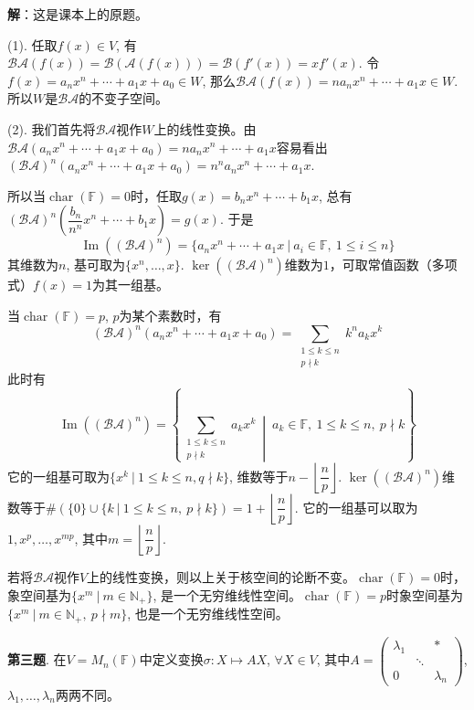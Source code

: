 {\bf 解}：这是课本上的原题。

(1). 任取$f(x) \in V$, 有$\mathscr{BA}(f(x)) = \mathscr{B}(\mathscr{A}(f(x))) = \mathscr{B}(f'(x)) = xf'(x)$. 令$f(x) = a_nx^n + \cdots + a_1x + a_0 \in W$, 那么$\mathscr{BA}(f(x)) = na_nx^n + \cdots + a_1x \in W$. 所以$W$是$\mathscr{BA}$的不变子空间。

(2). 我们首先将$\mathscr{BA}$视作$W$上的线性变换。由$\mathscr{BA}(a_nx^n + \cdots + a_1x + a_0) = na_nx^n + \cdots + a_1x$容易看出$(\mathscr{BA})^n(a_nx^n + \cdots + a_1x + a_0) = n^na_nx^n + \cdots + a_1x$.

所以当$\operatorname{char}(\mathbb{F}) = 0$时，任取$g(x) = b_nx^n + \cdots + b_1x$, 总有$(\mathscr{BA})^n\left(\dfrac{b_n}{n^n} x^n + \cdots + b_1x\right) = g(x).$ 于是
$$\operatorname{Im}((\mathscr{BA})^n) = \{ a_nx^n + \cdots + a_1x \ |\ a_i\in\mathbb{F},~ 1\leqslant i \leqslant n \}$$
其维数为$n$, 基可取为$\{x^n, \ldots, x\}$. $\ker((\mathscr{BA})^n)$维数为$1$，可取常值函数（多项式）$f(x) = 1$为其一组基。

当$\operatorname{char}(\mathbb{F}) = p$, $p$为某个素数时，有
$$(\mathscr{BA})^n(a_nx^n + \cdots + a_1x + a_0) = \sum_{\substack{1\leqslant k \leqslant n \\ p\nmid k}} k^n a_k x^k$$
此时有
$$\operatorname{Im}((\mathscr{BA})^n) = \left\{ \sum_{\substack{1\leqslant k \leqslant n \\ p\nmid k}} a_k x^k \ \middle|\ a_k\in\mathbb{F},~ 1\leqslant k \leqslant n, ~ p\nmid k \right\}$$
它的一组基可取为$\{ x^k \ |\ 1 \leqslant k \leqslant n, q\nmid k \}$, 维数等于$n - \left\lfloor \dfrac{n}{p} \right\rfloor$. $\ker((\mathscr{BA})^n)$维数等于$\# (\{ 0 \} \cup \{ k \ |\ 1\leqslant k \leqslant n, ~ p\nmid k \}) = 1 + \left\lfloor \dfrac{n}{p} \right\rfloor.$ 它的一组基可以取为$1, x^p, \ldots, x^{mp}$, 其中$m = \left\lfloor \dfrac{n}{p} \right\rfloor.$

若将$\mathscr{BA}$视作$V$上的线性变换，则以上关于核空间的论断不变。$\operatorname{char}(\mathbb{F}) = 0$时，象空间基为$\{x^m \ |\ m\in\mathbb{N}_+ \}$, 是一个无穷维线性空间。$\operatorname{char}(\mathbb{F}) = p$时象空间基为$\{ x^m \ |\ m\in\mathbb{N}_+, ~ p \nmid m \}$, 也是一个无穷维线性空间。

\newpageorvspace


{\bf 第三题}. 在$V = M_n(\mathbb{F})$中定义变换$\sigma: X \mapsto AX$, $\forall X\in V$, 其中$A = \begin{pmatrix} \lambda_1 & & \ast \\ & \ddots & \\ 0 & & \lambda_n \end{pmatrix}$, $\lambda_1,\ldots,\lambda_n$两两不同。

